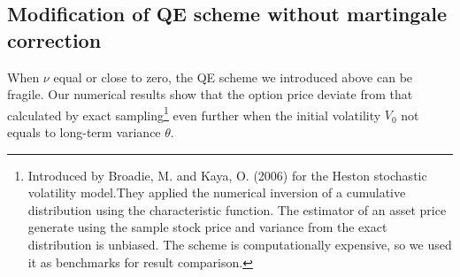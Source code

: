 \documentclass{ws-ijfe}
\begin{document}
\subsection{Modification of QE scheme without martingale correction}
When $\nu$ equal or close to zero, the QE scheme we introduced above can be fragile. Our numerical results show that the option price deviate from that calculated by exact sampling\footnote{Introduced by Broadie, M. and Kaya, O. (2006) for the Heston stochastic volatility model.They applied the numerical inversion of a cumulative distribution using the characteristic function. The estimator of an asset price generate using the sample stock price and variance from the exact distribution is unbiased. The scheme is computationally expensive, so we used it as benchmarks for result comparison.} even further when the initial volatility $V_0$ not equals to long-term variance $\theta$. %
\end{document}
